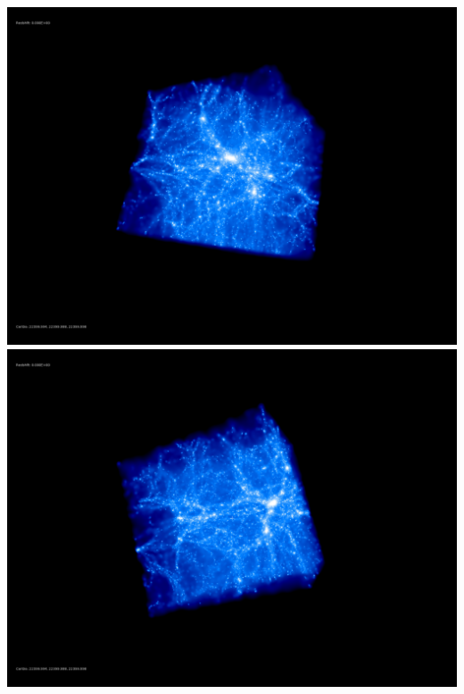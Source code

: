 \includegraphics[scale=0.1]{stages_51/rotate_00074.jpg} 
\includegraphics[scale=0.1]{stages_51/rotate_00131.jpg}  \\


